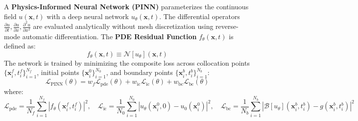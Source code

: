 \documentclass[11pt,a4paper]{article}
\theoremstyle{definition}
\begin{document}
A \textbf{Physics-Informed Neural Network (PINN)} parameterizes the continuous field $u(\mathbf{x}, t)$ with a deep neural network $u_\theta(\mathbf{x}, t)$. The differential operators $\frac{\partial u}{\partial t}, \frac{\partial u}{\partial x}, \frac{\partial^2 u}{\partial x^2}$ are evaluated analytically without mesh discretization using reverse-mode automatic differentiation. The \textbf{PDE Residual Function} $f_\theta(\mathbf{x}, t)$ is defined as:
{\boldmath
\begin{equation}
f_\theta(\mathbf{x}, t) \equiv \mathcal{N}[u_\theta](\mathbf{x}, t)
\end{equation}
}
The network is trained by minimizing the composite loss across collocation points $\{\mathbf{x}_i^f, t_i^f\}_{i=1}^{N_f}$, initial points $\{\mathbf{x}_i^0\}_{i=1}^{N_0}$, and boundary points $\{\mathbf{x}_i^b, t_i^b\}_{i=1}^{N_b}$:
{\boldmath
\begin{equation}
\mathcal{L}_{\text{PINN}}(\theta) = w_f \mathcal{L}_{\text{pde}}(\theta) + w_{\text{ic}} \mathcal{L}_{\text{ic}}(\theta) + w_{\text{bc}} \mathcal{L}_{\text{bc}}(\theta)
\end{equation}
}
where:
{\boldmath
\begin{equation}
\mathcal{L}_{\text{pde}} = \frac{1}{N_f}\sum_{i=1}^{N_f} \left| f_\theta(\mathbf{x}_i^f, t_i^f) \right|^2, \quad \mathcal{L}_{\text{ic}} = \frac{1}{N_0}\sum_{i=1}^{N_0} \left| u_\theta(\mathbf{x}_i^0, 0) - u_0(\mathbf{x}_i^0) \right|^2, \quad \mathcal{L}_{\text{bc}} = \frac{1}{N_b}\sum_{i=1}^{N_b} \left| \mathcal{B}[u_\theta](\mathbf{x}_i^b, t_i^b) - g(\mathbf{x}_i^b, t_i^b) \right|^2
\end{equation}
}
\end{document}
